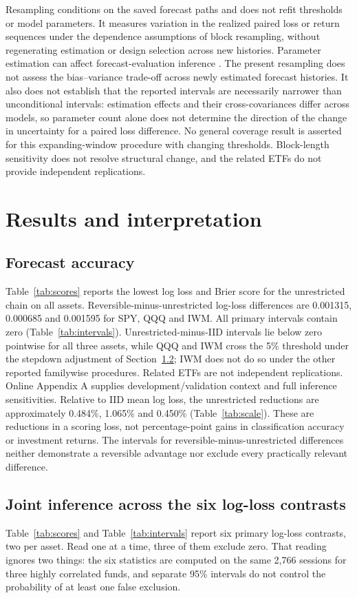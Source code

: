 Resampling conditions on the saved forecast paths and does not refit thresholds or model parameters. It measures variation in the realized paired loss or return sequences under the dependence assumptions of block resampling, without regenerating estimation or design selection across new histories. Parameter estimation can affect forecast-evaluation inference \citep{West1996}. The present resampling does not assess the bias--variance trade-off across newly estimated forecast histories. It also does not establish that the reported intervals are necessarily narrower than unconditional intervals: estimation effects and their cross-covariances differ across models, so parameter count alone does not determine the direction of the change in uncertainty for a paired loss difference. No general coverage result is asserted for this expanding-window procedure with changing thresholds. Block-length sensitivity does not resolve structural change, and the related ETFs do not provide independent replications.

\section{Results and interpretation}
\subsection{Forecast accuracy}
Table~\ref{tab:scores} reports the lowest log loss and Brier score for the unrestricted chain on all assets. Reversible-minus-unrestricted log-loss differences are 0.001315, 0.000685 and 0.001595 for SPY, QQQ and IWM. All primary intervals contain zero (Table~\ref{tab:intervals}). Unrestricted-minus-IID intervals lie below zero pointwise for all three assets, while QQQ and IWM cross the 5\% threshold under the stepdown adjustment of Section~\ref{sec:joint}; IWM does not do so under the other reported familywise procedures. Related ETFs are not independent replications. Online Appendix A supplies development/validation context and full inference sensitivities. Relative to IID mean log loss, the unrestricted reductions are approximately 0.484\%, 1.065\% and 0.450\% (Table~\ref{tab:scale}). These are reductions in a scoring loss, not percentage-point gains in classification accuracy or investment returns. The intervals for reversible-minus-unrestricted differences neither demonstrate a reversible advantage nor exclude every practically relevant difference.

\subsection{Joint inference across the six log-loss contrasts}\label{sec:joint}
Table~\ref{tab:scores} and Table~\ref{tab:intervals} report six primary log-loss contrasts, two per asset. Read one at a time, three of them exclude zero. That reading ignores two things: the six statistics are computed on the same 2,766 sessions for three highly correlated funds, and separate 95\% intervals do not control the probability of at least one false exclusion.

